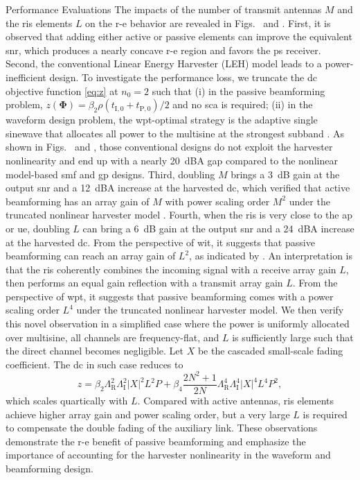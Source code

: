 \begin{section}{Performance Evaluations}
	The impacts of the number of transmit antennas $M$ and the \gls{ris} elements $L$ on the \gls{r-e} behavior are revealed in Figs.~ and . First, it is observed that adding either active or passive elements can improve the equivalent \gls{snr}, which produces a nearly concave \gls{r-e} region and favors the \gls{ps} receiver. Second, the conventional Linear Energy Harvester (LEH) model leads to a power-inefficient design. To investigate the performance loss, we truncate the \gls{dc} objective function \eqref{eq:z} at $n_0=2$ such that (i) in the passive beamforming problem, $z(\boldsymbol{\Phi}) = {\beta_2}{\rho}(t_{\mathrm{I},0}+t_{\mathrm{P},0})/2$ and no \gls{sca} is required; (ii) in the waveform design problem, the \gls{wpt}-optimal strategy is the adaptive single sinewave that allocates all power to the multisine at the strongest subband \cite{Clerckx2016a}. As shown in Figs.~ and , those conventional designs do not exploit the harvester nonlinearity and end up with a nearly \qty{20}{dBA} gap compared to the nonlinear model-based \gls{smf} and \gls{gp} designs. Third, doubling $M$ brings a \qty{3}{\dB} gain at the output \gls{snr} and a \qty{12}{dBA} increase at the harvested \gls{dc}, which verified that active beamforming has an array gain of $M$ \cite{Tse2005} with power scaling order $M^2$ under the truncated nonlinear harvester model \cite{Clerckx2016a,Clerckx2018b}. Fourth, when the \gls{ris} is very close to the \gls{ap} or \gls{ue}, doubling $L$ can bring a \qty{6}{\dB} gain at the output \gls{snr} and a \qty{24}{dBA} increase at the harvested \gls{dc}. From the perspective of \gls{wit}, it suggests that passive beamforming can reach an array gain of $L^2$, as indicated by \cite{Wu2019}. An interpretation is that the \gls{ris} coherently combines the incoming signal with a receive array gain $L$, then performs an equal gain reflection with a transmit array gain $L$. From the perspective of \gls{wpt}, it suggests that passive beamforming comes with a power scaling order $L^4$ under the truncated nonlinear harvester model. We then verify this novel observation in a simplified case where the power is uniformly allocated over multisine, all channels are frequency-flat, and $L$ is sufficiently large such that the direct channel becomes negligible. Let $X$ be the cascaded small-scale fading coefficient. The \gls{dc} in such case reduces to
	\begin{equation}
		z = \beta_2 \Lambda_{\mathrm{R}}^2 \Lambda_{\mathrm{I}}^2 \lvert X \rvert^2 L^2 P + \beta_4 \frac{2N^2 + 1}{2N} \Lambda_{\mathrm{R}}^4 \Lambda_{\mathrm{I}}^4 \lvert X \rvert^4 L^4 P^2,
	\end{equation}
	which scales quartically with $L$. Compared with active antennas, \gls{ris} elements achieve higher array gain and power scaling order, but a very large $L$ is required to compensate the double fading of the auxiliary link. These observations demonstrate the \gls{r-e} benefit of passive beamforming and emphasize the importance of accounting for the harvester nonlinearity in the waveform and beamforming design.


\end{section}
